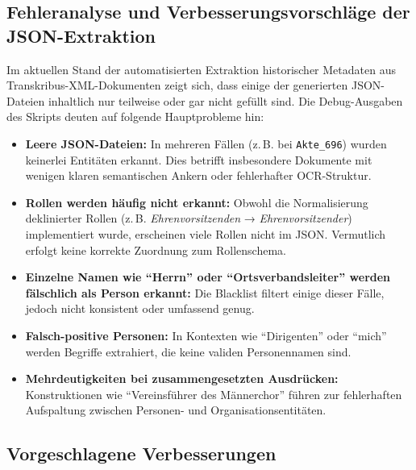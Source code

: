 \documentclass{article}
\begin{document}
\subsection{Fehleranalyse und Verbesserungsvorschläge der JSON-Extraktion}

Im aktuellen Stand der automatisierten Extraktion historischer Metadaten aus Transkribus-XML-Dokumenten zeigt sich, dass einige der generierten JSON-Dateien inhaltlich nur teilweise oder gar nicht gefüllt sind. Die Debug-Ausgaben des Skripts deuten auf folgende Hauptprobleme hin:

\begin{itemize}
    \item \textbf{Leere JSON-Dateien:} In mehreren Fällen (z.\,B. bei \texttt{Akte\_696}) wurden keinerlei Entitäten erkannt. Dies betrifft insbesondere Dokumente mit wenigen klaren semantischen Ankern oder fehlerhafter OCR-Struktur.
    \item \textbf{Rollen werden häufig nicht erkannt:} Obwohl die Normalisierung deklinierter Rollen (z.\,B. \textit{Ehrenvorsitzenden} → \textit{Ehrenvorsitzender}) implementiert wurde, erscheinen viele Rollen nicht im JSON. Vermutlich erfolgt keine korrekte Zuordnung zum Rollenschema.
    \item \textbf{Einzelne Namen wie ``Herrn'' oder ``Ortsverbandsleiter'' werden fälschlich als Person erkannt:} Die Blacklist filtert einige dieser Fälle, jedoch nicht konsistent oder umfassend genug.
    \item \textbf{Falsch-positive Personen:} In Kontexten wie ``Dirigenten'' oder ``mich'' werden Begriffe extrahiert, die keine validen Personennamen sind.
    \item \textbf{Mehrdeutigkeiten bei zusammengesetzten Ausdrücken:} Konstruktionen wie ``Vereinsführer des Männerchor'' führen zur fehlerhaften Aufspaltung zwischen Personen- und Organisationsentitäten.
\end{itemize}

\subsection{Vorgeschlagene Verbesserungen}
\end{document}
